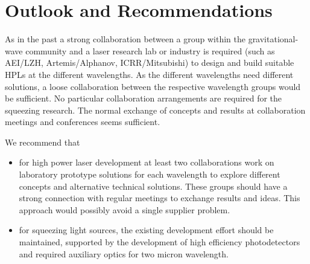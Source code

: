 \section{Outlook and Recommendations}
As in the past a strong collaboration between a group within the gravitational-wave community and a laser research lab or industry is required (such as \ac{AEI}/\ac{LZH}, \ac{Artemis}/\ac{Alphanov}, \ac{ICRR}/\ac{Mitsubishi}) to design and build suitable \acp{HPL} at the different wavelengths. As the different wavelengths need different solutions, a loose collaboration between the respective wavelength groups would be sufficient.  No particular collaboration arrangements are required for the squeezing research. The normal exchange of concepts and results at collaboration meetings and conferences seems sufficient. 

We recommend that
\begin{itemize}
\item for high power laser development at least two collaborations work on laboratory prototype solutions for each wavelength to explore different concepts and alternative technical solutions.  These groups should have a strong connection with regular meetings to exchange results and ideas. This approach would possibly avoid a single supplier problem.
\item for squeezing light sources, the existing development effort should be maintained, supported by the development of high efficiency photodetectors and required auxiliary optics for two micron wavelength.  
\end{itemize}

